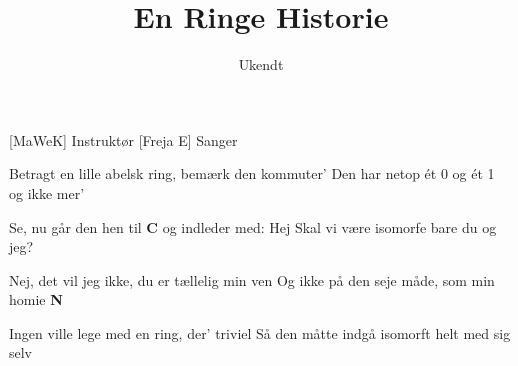 \documentclass[a4paper,11pt]{article}
\title{En Ringe Historie}
\author{Ukendt}
\begin{document}
\maketitle

\begin{roles}
[MaWeK] Instruktør
[Freja E] Sanger
\end{roles}

\begin{song}
 Betragt en lille abelsk ring, bemærk den kommuter'
Den har netop ét 0 og ét 1 og ikke mer'

Se, nu går den hen til \textbf{C} og indleder med: Hej
Skal vi være isomorfe bare du og jeg?

Nej, det vil jeg ikke, du er tællelig min ven
Og ikke på den seje måde, som min homie \textbf{N}

Ingen ville lege med en ring, der' triviel
Så den måtte indgå isomorft helt med sig selv
\end{song}
\end{document}
